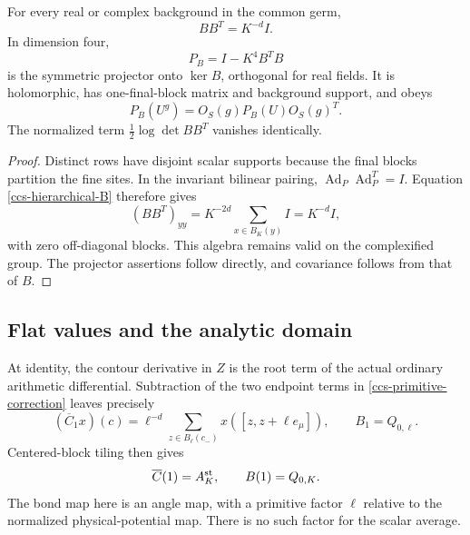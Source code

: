 \begin{theorem}
\label{ccs-projector-theorem}
For every real or complex background in the common germ,
\begin{equation}
                 BB^T=K^{-d}I.
 \label{ccs-row-Gram}
\end{equation}
In dimension four,
\begin{equation}
                  P_B=I-K^4B^TB
 \label{ccs-projector}
\end{equation}
is the symmetric projector onto \(\ker B\), orthogonal for
real fields. It is holomorphic, has one-final-block matrix
and background support, and obeys
\begin{equation}
          P_B(U^g)=O_S(g)P_B(U)O_S(g)^T.
 \label{ccs-projector-covariance}
\end{equation}
The normalized term \(\frac12\log\det BB^T\) vanishes identically.
\end{theorem}

\begin{proof}
Distinct rows have disjoint scalar supports because the final
blocks partition the fine sites. In the invariant bilinear
pairing,
\(\operatorname{Ad}_P\operatorname{Ad}_P^T=I\).
Equation \eqref{ccs-hierarchical-B} therefore gives
\[
 (BB^T)_{yy}
      =K^{-2d}\sum_{x\in B_K(y)}I=K^{-d}I,
\]
with zero off-diagonal blocks. This algebra remains valid on
the complexified group. The projector assertions follow
directly, and covariance follows from that of \(B\).
\end{proof}

\subsection{Flat values and the analytic domain}
\label{ccs-analytic-section}

At identity, the contour derivative in \(Z\) is the root term
of the actual ordinary arithmetic differential. Subtraction
of the two endpoint terms in
\eqref{ccs-primitive-correction} leaves precisely
\begin{equation}
 (\overline C_1x)(c)=\ell^{-d}
       \sum_{z\in B_\ell(c_-)}x([z,z+\ell e_\mu]),
 \qquad B_1=Q_{0,\ell}.
 \label{ccs-flat-primitive}
\end{equation}
Centered-block tiling then gives
\begin{equation}
             \overline C(1)=A_K^{\rm st},\qquad
                         B(1)=Q_{0,K}.
 \label{ccs-flat-composite}
\end{equation}
The bond map here is an angle map, with a primitive factor
\(\ell\) relative to the normalized physical-potential map.
There is no such factor for the scalar average.

